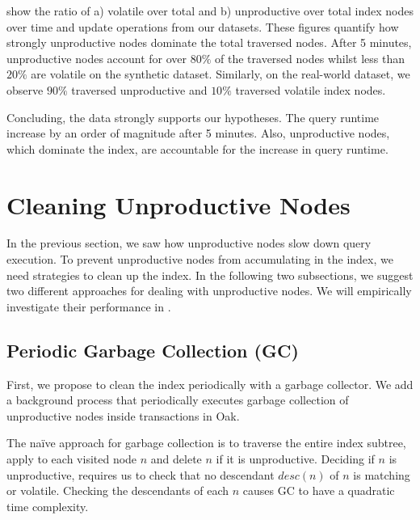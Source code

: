 \documentclass[abstracton,12pt]{scrartcl}
\theoremstyle{definition}
\begin{document}
show the ratio of a) volatile over total and b) unproductive over total index nodes
over time and update operations from our datasets. These figures quantify how
strongly unproductive nodes dominate the total traversed nodes. After 5 minutes,
unproductive nodes account for over $80\%$ of the traversed nodes whilst
less than $20\%$ are volatile on the synthetic dataset.
Similarly, on the real-world dataset, we observe $90\%$ traversed unproductive and $10\%$
traversed volatile index nodes.

Concluding, the data strongly supports our hypotheses. The query runtime
increase by an order of magnitude after 5 minutes. Also, unproductive
nodes, which dominate the index, are accountable for the increase in query runtime. 

\newpage

\section{Cleaning Unproductive Nodes}

In the previous section, we saw how unproductive nodes slow down query
execution. To prevent unproductive nodes from accumulating in the index, we
need strategies to clean up the index. In the following two subsections, we suggest two
different approaches for dealing with unproductive nodes. We will empirically
investigate their performance in .

\subsection{Periodic Garbage Collection (GC)}
\label{sec:gc}

First, we propose to clean the index periodically with a garbage collector.
We add a background process that periodically executes
garbage collection of unproductive nodes inside transactions in Oak.

The naïve approach for garbage collection is to traverse the entire index subtree,
apply  to each visited node $n$ and delete $n$ if it
is unproductive. Deciding if $n$ is unproductive, requires us to check that no
descendant $desc(n)$ of $n$ is matching or volatile. Checking the descendants of
each $n$ causes GC to have a quadratic time complexity. 
\end{document}

